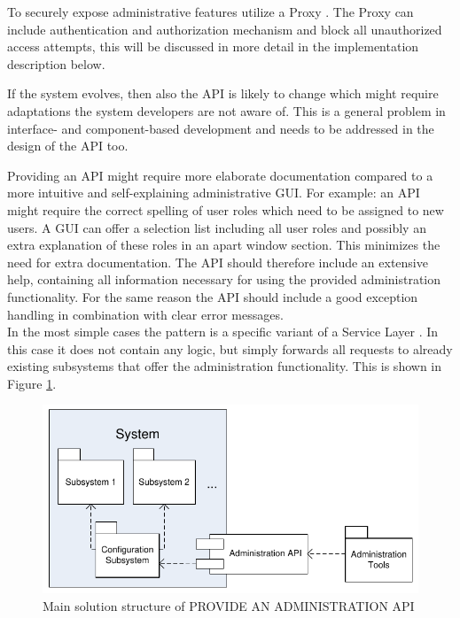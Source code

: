 To securely expose administrative features utilize a {\sc Proxy} \cite{Buschmann1996}. The {\sc Proxy} can include authentication and authorization mechanism and block all unauthorized access attempts, this will be discussed in more detail in the implementation description below.

If the system evolves, then also the API is likely to change which might require adaptations the system developers are not aware of. This is a general problem in interface- and component-based development and needs to be addressed in the design of the API too. 

Providing an API might require more elaborate documentation compared to a more intuitive and self-explaining administrative GUI. For example: an API might require the correct spelling of user roles which need to be assigned to new users. A GUI can offer a selection list including all user roles and possibly an extra explanation of these roles in an apart window section. This minimizes the need for extra documentation. The API should therefore include an extensive help, containing all information necessary for using the provided administration functionality. For the same reason the API should include a good exception handling in combination with clear error messages. \\


In the most simple cases the pattern is a specific variant of a {\sc Service Layer} \cite{Fowler:2002:PEA:579257}. In this case it does not contain any logic, but simply forwards all requests to already existing subsystems that offer the administration functionality. This is shown in Figure \ref{fig:provideAPIDiagram-01}.  

\begin{figure}[h]
\centering
\includegraphics{patterns/provideAPIDiagram-01.pdf}
\caption{Main solution structure of PROVIDE AN ADMINISTRATION API}
\label{fig:provideAPIDiagram-01}
\end{figure}

